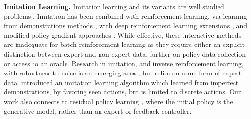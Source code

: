\documentclass{article}
\begin{document}
\textbf{Imitation Learning.} Imitation learning and its variants are well studied problems \citep{schaal1999imitation,argall2009survey, hussein2017imitation}. 
Imitation has been combined with reinforcement learning, via learning from demonstrations methods \cite{kim2013learning,piot2014boosted,chemali2015direct}, with deep reinforcement learning extensions \cite{hester2017deep,vevcerik2017leveraging}, and modified policy gradient approaches \cite{ho2016model, sun2017deeply, cheng2018fast, sun2018truncated}. While effective, these interactive methods are inadequate for batch reinforcement learning as they require either an explicit distinction between expert and non-expert data, further on-policy data collection or access to an oracle. 
Research in imitation, and inverse reinforcement learning, with robustness to noise is an emerging area \citep{evans2016learning, nair2018overcoming}, but relies on some form of expert data. \citet{gao2018imperfect} introduced an imitation learning algorithm which learned from imperfect demonstrations, by favoring seen actions, but is limited to discrete actions. Our work also connects to residual policy learning \cite{johannink2018residual, silver2018residual}, where the initial policy is the generative model, rather than an expert or feedback controller. 
\end{document}
